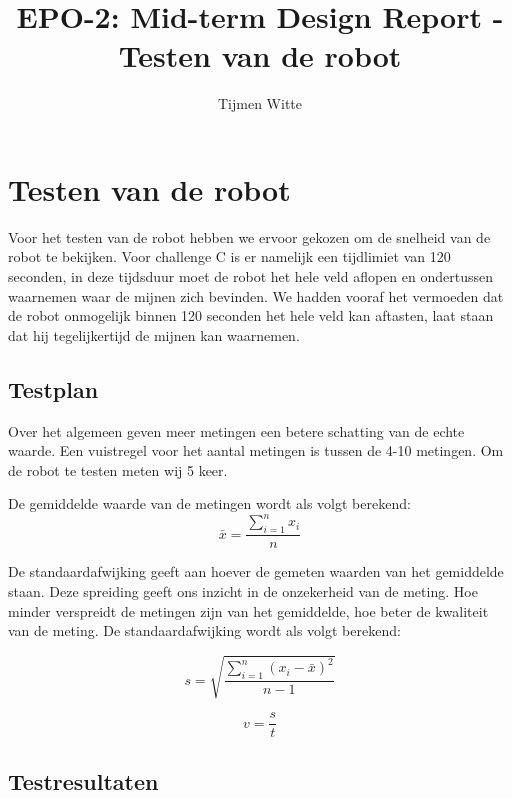 \documentclass{report}
\title{EPO-2: Mid-term Design Report - Testen van de robot}
\author{Tijmen Witte}
\begin{document}
\chapter{Testen van de robot}
\label{ch:testen_robot}
Voor het testen van de robot hebben we ervoor gekozen om de snelheid van de robot te bekijken.
Voor challenge C is er namelijk een tijdlimiet van 120 seconden, in deze tijdsduur moet de robot het hele veld aflopen en ondertussen waarnemen waar de mijnen zich bevinden.
We hadden vooraf het vermoeden dat de robot onmogelijk binnen 120 seconden het hele veld kan aftasten, laat staan dat hij tegelijkertijd de mijnen kan waarnemen. 

\section{Testplan}
\label{sec:testplan}
Over het algemeen geven meer metingen een betere schatting van de echte waarde. Een vuistregel voor het aantal metingen is tussen de 4-10 metingen. Om de robot te testen meten wij 5 keer. 

De gemiddelde waarde van de metingen wordt als volgt berekend:
\begin{equation}
\label{gemidd}
\bar{x}=\frac{\sum_{i=1}^{n}x_i}{n}
\end{equation}

De standaardafwijking geeft aan hoever de gemeten waarden van het gemiddelde staan. Deze spreiding geeft ons inzicht in de onzekerheid van de meting. Hoe minder verspreidt de metingen zijn van het gemiddelde, hoe beter de kwaliteit van de meting. De standaardafwijking wordt als volgt berekend:

\begin{equation} 
\label{eq:stddev}
s=\sqrt{\frac{\sum_{i=1}^{n}{(x_i-\bar{x})^2}}{n-1}}
\end{equation}

\begin{equation}
\label{snelheid}
v=\frac{s}{t}
\end{equation}

\section{Testresultaten}
\label{sec:testresultate}
\end{document}
